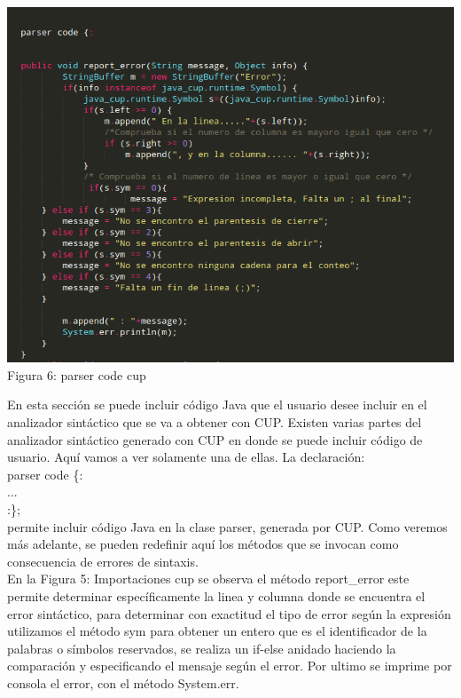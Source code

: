 \documentclass[a4paper,openright,12pt]{article}
\begin{document}
\begin{center}
\includegraphics[height=0.5\textheight]{parser.png}
\\
Figura 6: parser code cup
\end{center}

En esta sección se puede incluir código Java que el usuario desee incluir en el analizador sintáctico que se va a obtener con CUP. Existen varias partes del analizador sintáctico generado con CUP en donde se puede incluir código de usuario. Aquí vamos a ver solamente una de ellas. La declaración:\\

parser code \{:\\
...\\
:\};\\
permite incluir código Java en la clase parser, generada por CUP. Como veremos más adelante, se pueden redefinir aquí los métodos que se invocan como consecuencia de errores de sintaxis.\\


En la Figura 5: Importaciones cup se observa el método report\_error este permite
determinar específicamente la linea y columna donde se encuentra el error sintáctico, para determinar con exactitud el tipo de error según la expresión
utilizamos el método sym para obtener un entero que es el identificador de la 
palabras o símbolos reservados, se realiza un if-else anidado haciendo la comparación y especificando el mensaje según el error.
Por ultimo se imprime por consola el error, con el método System.err.\\
\end{document}

